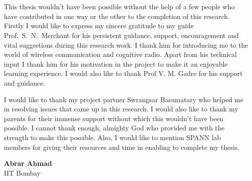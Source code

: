 \chapter*{}


This thesis wouldn't have been possible without the help of a few people who 
have contributed in one way or the other to the completion of this research.
Firstly I would like to express my sincere gratitude to my guide 
Prof.~S.~N.~Merchant for his persistent guidance, support, encouragement and
vital suggestions during this research work. I thank him for introducing me to
the world of wireless communication and cognitive radio. Apart from his
technical input I thank him for his motivation in the project to make it an
enjoyable learning experience. I would also like to thank Prof V. M. Gadre for
his support and guidance.

I would like to thank my project partner Swrangsar Basumatary who helped me in
resolving issues that came up in this research. I would also like to thank my
parents for their immense support without which this wouldn't have been
possible. I cannot thank enough, almighty God who provided me with the
strength to make this possible. Also, I would like to mention SPANN lab
members for giving their resources and time in enabling to complete my thesis.

\vspace{1.5cm}
\begin{flushright}
\textbf{Abrar Ahmad} \\
IIT Bombay
\end{flushright}